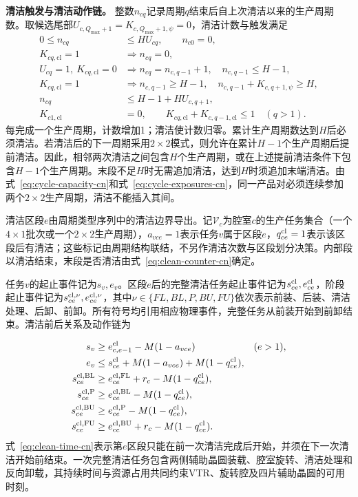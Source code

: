 \documentclass[final,5p,times,twocolumn]{elsarticle}
\begin{document}
\noindent\textbf{清洁触发与清洁动作链。}
整数$n_{cq}$记录周期$q$结束后自上次清洁以来的生产周期数。取候选尾部$U_{c,Q_{\max}+1}=K_{c,Q_{\max}+1,\psi}=0$，清洁计数与触发满足
\begin{equation}
\begin{aligned}
0\le n_{cq}&\le H U_{cq},\qquad n_{c0}=0,\\
K_{cq,\mathrm{cl}}=1&\Rightarrow n_{cq}=0,\\
U_{cq}=1,\ K_{cq,\mathrm{cl}}=0
&\Rightarrow n_{cq}=n_{c,q-1}+1,\quad n_{c,q-1}\le H-1,\\
K_{cq,\mathrm{cl}}=1&\Rightarrow n_{c,q-1}\ge H-1,\quad
n_{c,q-1}+K_{c,q+1,\psi}\ge H,\\
n_{cq}&\le H-1+H U_{c,q+1},\\
K_{c1,\mathrm{cl}}&=0,\qquad
K_{cq,\mathrm{cl}}+K_{c,q-1,\mathrm{cl}}\le1\quad(q>1).
\end{aligned}
\label{eq:clean-counter-cn}
\end{equation}
每完成一个生产周期，计数增加1；清洁使计数归零。累计生产周期数达到$H$后必须清洁。若清洁后的下一周期采用$2\times2$模式，则允许在累计$H-1$个生产周期后提前清洁。因此，相邻两次清洁之间包含$H$个生产周期，或在上述提前清洁条件下包含$H-1$个生产周期。末段不足$H$时无需追加清洁，达到$H$时须追加末端清洁。由式~\eqref{eq:cycle-capacity-cn}和式~\eqref{eq:cycle-exposures-cn}，同一产品对必须连续参加两个$2\times2$生产周期，清洁不能插入其间。

清洁区段$e$由周期类型序列中的清洁边界导出。记$\mathcal V_c$为腔室$c$的生产任务集合（一个$4\times1$批次或一个$2\times2$生产周期），$a_{vce}=1$表示任务$v$属于区段$e$，$q^{\rm cl}_{ce}=1$表示该区段后有清洁；这些标记由周期结构联结，不另作清洁次数与区段划分决策。内部段以清洁结束，末段是否清洁由式~\eqref{eq:clean-counter-cn}确定。

任务$v$的起止事件记为$s_v,e_v$。区段$e$后的完整清洁任务起止事件记为$s^{\rm cl}_{ce},e^{\rm cl}_{ce}$，阶段起止事件记为$s^{\rm cl,\nu}_{ce},e^{\rm cl,\nu}_{ce}$，其中$\nu\in\{FL,BL,P,BU,FU\}$依次表示前装、后装、清洁处理、后卸、前卸。所有符号均引用相应物理事件，完整任务从前装开始到前卸结束。清洁前后关系及动作链为

\begin{equation}
\begin{aligned}
s_v&\ge e^{\rm cl}_{c,e-1}-M(1-a_{vce}) &&(e>1),\\
e_v&\le s^{\rm cl}_{ce}+M(1-a_{vce})+M(1-q^{\rm cl}_{ce}),\\
s^{\rm cl,BL}_{ce}&\ge e^{\rm cl,FL}_{ce}+r_c-M(1-q^{\rm cl}_{ce}),\\
s^{\rm cl,P}_{ce}&\ge e^{\rm cl,BL}_{ce}-M(1-q^{\rm cl}_{ce}),\\
s^{\rm cl,BU}_{ce}&\ge e^{\rm cl,P}_{ce}-M(1-q^{\rm cl}_{ce}),\\
s^{\rm cl,FU}_{ce}&\ge e^{\rm cl,BU}_{ce}+r_c-M(1-q^{\rm cl}_{ce}).
\end{aligned}
\label{eq:clean-time-cn}
\end{equation}
式~\eqref{eq:clean-time-cn}表示第$e$区段只能在前一次清洁完成后开始，并须在下一次清洁开始前结束。一次完整清洁任务包含两侧辅助晶圆装载、腔室旋转、清洁处理和反向卸载，其持续时间与资源占用共同约束VTR、旋转腔及四片辅助晶圆的可用时刻。
\end{document}
